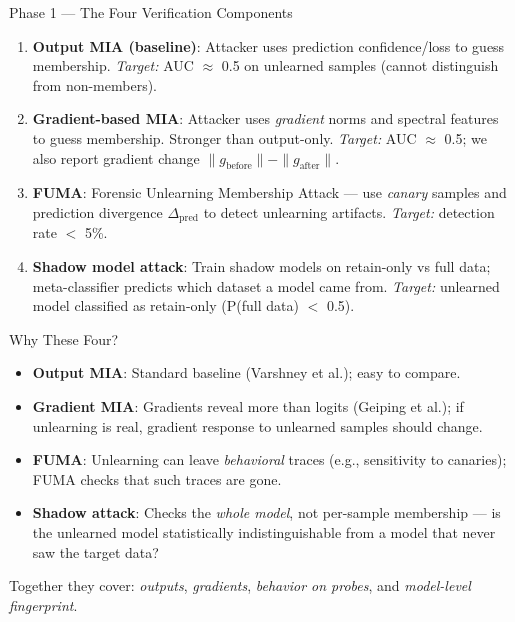 \documentclass[11pt,aspectratio=169]{beamer}
\begin{document}
\begin{frame}{Phase 1 — The Four Verification Components}
  \begin{enumerate}
    \item \textbf{Output MIA (baseline)}: Attacker uses prediction confidence/loss to guess membership. \emph{Target:} AUC $\approx$ 0.5 on unlearned samples (cannot distinguish from non-members).
    \item \textbf{Gradient-based MIA}: Attacker uses \emph{gradient} norms and spectral features to guess membership. Stronger than output-only. \emph{Target:} AUC $\approx$ 0.5; we also report gradient change $\|g_{\text{before}}\| - \|g_{\text{after}}\|$.
    \item \textbf{FUMA}: Forensic Unlearning Membership Attack — use \emph{canary} samples and prediction divergence $\Delta_{\text{pred}}$ to detect unlearning artifacts. \emph{Target:} detection rate $<$ 5\%.
    \item \textbf{Shadow model attack}: Train shadow models on retain-only vs full data; meta-classifier predicts which dataset a model came from. \emph{Target:} unlearned model classified as retain-only (P(full data) $<$ 0.5).
  \end{enumerate}
\end{frame}

\begin{frame}{Why These Four?}
  \begin{itemize}
    \item \textbf{Output MIA}: Standard baseline (Varshney et al.); easy to compare.
    \item \textbf{Gradient MIA}: Gradients reveal more than logits (Geiping et al.); if unlearning is real, gradient response to unlearned samples should change.
    \item \textbf{FUMA}: Unlearning can leave \emph{behavioral} traces (e.g., sensitivity to canaries); FUMA checks that such traces are gone.
    \item \textbf{Shadow attack}: Checks the \emph{whole model}, not per-sample membership — is the unlearned model statistically indistinguishable from a model that never saw the target data?
  \end{itemize}
  \vspace{0.5em}
  Together they cover: \emph{outputs}, \emph{gradients}, \emph{behavior on probes}, and \emph{model-level fingerprint}.
\end{frame}
\end{document}
